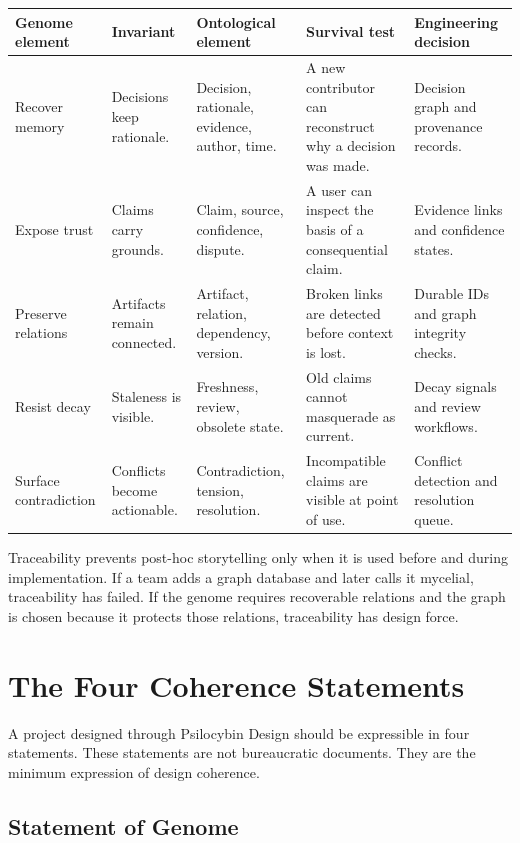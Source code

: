 \documentclass[11pt]{article}
\begin{document}
\begin{longtable}{|p{}|p{}|p{}|p{}|p{}|}
\hline
\textbf{Genome element} & \textbf{Invariant} & \textbf{Ontological element} & \textbf{Survival test} & \textbf{Engineering decision} \\
\hline
Recover memory & Decisions keep rationale. & Decision, rationale, evidence, author, time. & A new contributor can reconstruct why a decision was made. & Decision graph and provenance records. \\
\hline
Expose trust & Claims carry grounds. & Claim, source, confidence, dispute. & A user can inspect the basis of a consequential claim. & Evidence links and confidence states. \\
\hline
Preserve relations & Artifacts remain connected. & Artifact, relation, dependency, version. & Broken links are detected before context is lost. & Durable IDs and graph integrity checks. \\
\hline
Resist decay & Staleness is visible. & Freshness, review, obsolete state. & Old claims cannot masquerade as current. & Decay signals and review workflows. \\
\hline
Surface contradiction & Conflicts become actionable. & Contradiction, tension, resolution. & Incompatible claims are visible at point of use. & Conflict detection and resolution queue. \\
\hline
\end{longtable}

Traceability prevents post-hoc storytelling only when it is used before and during implementation. If a team adds a graph database and later calls it mycelial, traceability has failed. If the genome requires recoverable relations and the graph is chosen because it protects those relations, traceability has design force.

\section{The Four Coherence Statements}

A project designed through Psilocybin Design should be expressible in four statements. These statements are not bureaucratic documents. They are the minimum expression of design coherence.

\subsection{Statement of Genome}
\end{document}
